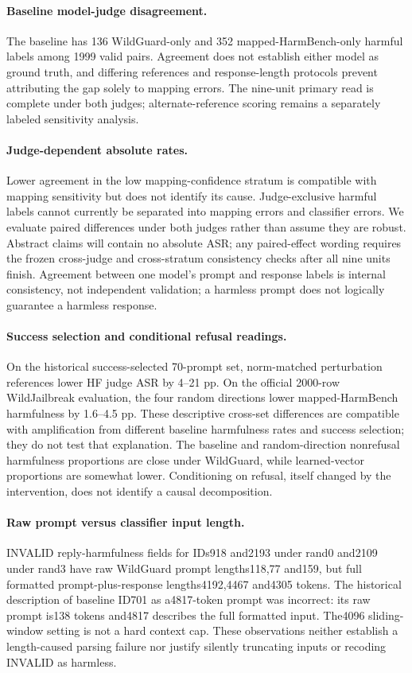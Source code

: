 \paragraph{Baseline model-judge disagreement.}

The baseline has 136 WildGuard-only and 352 mapped-HarmBench-only harmful labels among 1999 valid pairs. Agreement does not establish either model as ground truth, and differing references and response-length protocols prevent attributing the gap solely to mapping errors. The nine-unit primary read is complete under both judges; alternate-reference scoring remains a separately labeled sensitivity analysis.

\paragraph{Judge-dependent absolute rates.} Lower agreement in the low mapping-confidence stratum is compatible with mapping sensitivity but does not identify its cause. Judge-exclusive harmful labels cannot currently be separated into mapping errors and classifier errors. We evaluate paired differences under both judges rather than assume they are robust. Abstract claims will contain no absolute ASR; any paired-effect wording requires the frozen cross-judge and cross-stratum consistency checks after all nine units finish. Agreement between one model's prompt and response labels is internal consistency, not independent validation; a harmless prompt does not logically guarantee a harmless response.

\paragraph{Success selection and conditional refusal readings.}
On the historical success-selected 70-prompt set, norm-matched perturbation references lower HF judge ASR by 4--21 pp. On the official 2000-row WildJailbreak evaluation, the four random directions lower mapped-HarmBench harmfulness by 1.6--4.5 pp. These descriptive cross-set differences are compatible with amplification from different baseline harmfulness rates and success selection; they do not test that explanation. The baseline and random-direction nonrefusal harmfulness proportions are close under WildGuard, while learned-vector proportions are somewhat lower. Conditioning on refusal, itself changed by the intervention, does not identify a causal decomposition.

\paragraph{Raw prompt versus classifier input length.}
INVALID reply-harmfulness fields for IDs918 and2193 under rand0 and2109 under rand3 have raw WildGuard prompt lengths118,77 and159, but full formatted prompt-plus-response lengths4192,4467 and4305 tokens. The historical description of baseline ID701 as a4817-token prompt was incorrect: its raw prompt is138 tokens and4817 describes the full formatted input. The4096 sliding-window setting is not a hard context cap. These observations neither establish a length-caused parsing failure nor justify silently truncating inputs or recoding INVALID as harmless.

